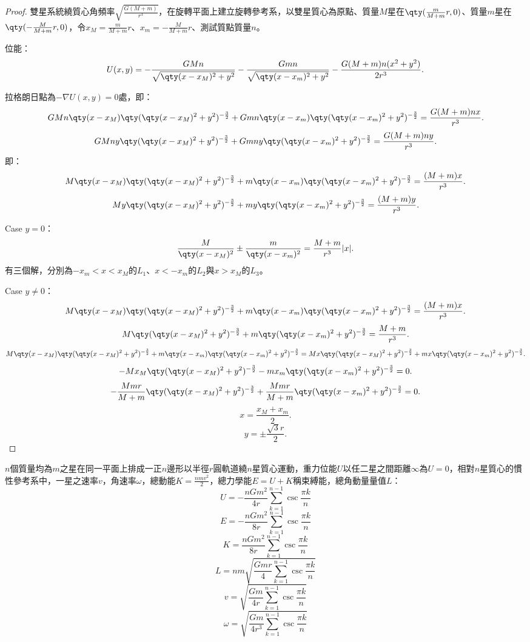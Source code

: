 \documentclass[a4paper,12pt]{article}
\begin{document}
\begin{proof}
雙星系統繞質心角頻率$\sqrt{\frac{G(M+m)}{r^3}}$，在旋轉平面上建立旋轉參考系，以雙星質心為原點、質量$M$星在$\qty(\frac{m}{M+m}r,0)$、質量$m$星在$\qty(-\frac{M}{M+m}r,0)$，令$x_M=\frac{m}{M+m}r$、$x_m=-\frac{M}{M+m}r$、測試質點質量$n$。

位能：
\[U(x,y)=-\frac{GMn}{\sqrt{\qty(x-x_M)^2+y^2}}-\frac{Gmn}{\sqrt{\qty(x-x_m)^2+y^2}}-\frac{G(M+m)n(x^2+y^2)}{2r^3}.\]

拉格朗日點為$-\nabla U(x,y)=0$處，即：
\[GMn\qty(x-x_M)\qty(\qty(x-x_M)^2+y^2)^{-\frac{3}{2}}+Gmn\qty(x-x_m)\qty(\qty(x-x_m)^2+y^2)^{-\frac{3}{2}}=\frac{G(M+m)nx}{r^3}.\]
\[GMny\qty(\qty(x-x_M)^2+y^2)^{-\frac{3}{2}}+Gmny\qty(\qty(x-x_m)^2+y^2)^{-\frac{3}{2}}=\frac{G(M+m)ny}{r^3}.\]
即：
\[M\qty(x-x_M)\qty(\qty(x-x_M)^2+y^2)^{-\frac{3}{2}}+m\qty(x-x_m)\qty(\qty(x-x_m)^2+y^2)^{-\frac{3}{2}}=\frac{(M+m)x}{r^3}.\]
\[My\qty(\qty(x-x_M)^2+y^2)^{-\frac{3}{2}}+my\qty(\qty(x-x_m)^2+y^2)^{-\frac{3}{2}}=\frac{(M+m)y}{r^3}.\]

Case $y=0$：
\[\frac{M}{\qty(x-x_M)^2}\pm\frac{m}{\qty(x-x_m)^2}=\frac{M+m}{r^3}|x|.\]
有三個解，分別為$-x_m<x<x_M$的$L_1$、$x<-x_m$的$L_2$與$x>x_M$的$L_3$。

Case $y\neq 0$：
\[M\qty(x-x_M)\qty(\qty(x-x_M)^2+y^2)^{-\frac{3}{2}}+m\qty(x-x_m)\qty(\qty(x-x_m)^2+y^2)^{-\frac{3}{2}}=\frac{(M+m)x}{r^3}.\]
\[M\qty(\qty(x-x_M)^2+y^2)^{-\frac{3}{2}}+m\qty(\qty(x-x_m)^2+y^2)^{-\frac{3}{2}}=\frac{M+m}{r^3}.\]
\[M\qty(x-x_M)\qty(\qty(x-x_M)^2+y^2)^{-\frac{3}{2}}+m\qty(x-x_m)\qty(\qty(x-x_m)^2+y^2)^{-\frac{3}{2}}=Mx\qty(\qty(x-x_M)^2+y^2)^{-\frac{3}{2}}+mx\qty(\qty(x-x_m)^2+y^2)^{-\frac{3}{2}}.\]
\[-Mx_M\qty(\qty(x-x_M)^2+y^2)^{-\frac{3}{2}}-mx_m\qty(\qty(x-x_m)^2+y^2)^{-\frac{3}{2}}=0.\]
\[-\frac{Mmr}{M+m}\qty(\qty(x-x_M)^2+y^2)^{-\frac{3}{2}}+\frac{Mmr}{M+m}\qty(\qty(x-x_m)^2+y^2)^{-\frac{3}{2}}=0.\]
\[x=\frac{x_M+x_m}{2}.\]
\[y=\pm\frac{\sqrt{3}r}{2}.\]
\end{proof}
$n$個質量均為$m$之星在同一平面上排成一正$n$邊形以半徑$r$圓軌道繞$n$星質心運動，重力位能$U$以任二星之間距離$\infty$為$U=0$，相對$n$星質心的慣性參考系中，一星之速率$v$，角速率$\omega$，總動能$K=\frac{nmv^2}{2}$，總力學能$E=U+K$稱束縛能，總角動量量值$L$：
\[U=-\frac{nGm^2}{4r}\sum_{k=1}^{n-1}\csc\frac{\pi k}{n}\]
\[E=-\frac{nGm^2}{8r}\sum_{k=1}^{n-1}\csc\frac{\pi k}{n}\]
\[K=\frac{nGm^2}{8r}\sum_{k=1}^{n-1}\csc\frac{\pi k}{n}\]
\[L=nm\sqrt{\frac{Gmr}{4}\sum_{k=1}^{n-1}\csc\frac{\pi k}{n}}\]
\[v=\sqrt{\frac{Gm}{4r}\sum_{k=1}^{n-1}\csc\frac{\pi k}{n}}\]
\[\omega=\sqrt{\frac{Gm}{4r^3}\sum_{k=1}^{n-1}\csc\frac{\pi k}{n}}\]
\end{document}
